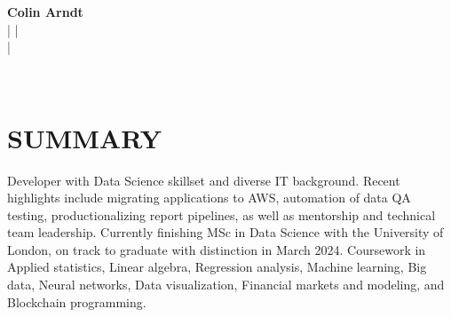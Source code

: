 \documentclass[letterpaper,11pt]{article}
\begin{document}
\begin{center}
    \textbf{\Huge Colin Arndt} \\ \vspace{5pt}
    \small 
    \faPhone \hspace{2pt}{858.281.3748} \hspace{1pt}|
    \hspace{1pt} \faEnvelope \hspace{3pt}{colin.f.arndt@gmail.com} \hspace{1pt}| 
    \hspace{1pt}{Charlotte, NC}
    \vspace{2pt} \\
    \hspace{1pt} \faLinkedin \hspace{3pt}{linkedin.com/in/colinarndt} \hspace{1pt} |
    \hspace{1pt} \faGithub   \hspace{3pt}{github.com/colinarndt}  


    \\ \vspace{-3pt}
\end{center}

\section {SUMMARY}
 \begin{itemize}[leftmargin=0in, label={}]
    \small{\item{
      
       Developer with Data Science skillset and diverse IT background. Recent highlights include migrating applications to AWS, automation of data QA testing, productionalizing report pipelines, as well as mentorship and technical team leadership. Currently finishing MSc in Data Science with the University of London, on track to graduate with distinction in March 2024. Coursework in Applied statistics, Linear algebra, Regression analysis, Machine learning, Big data, Neural networks, Data visualization, Financial markets and modeling, and Blockchain programming.  
    }}
 \end{itemize}
\end{document}
